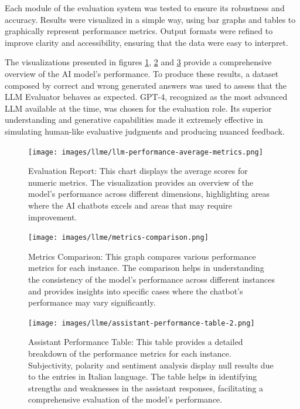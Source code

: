 Each module of the evaluation system was tested to ensure its robustness and accuracy. Results were visualized in a simple way, using bar graphs and tables to graphically represent performance metrics. Output formats were refined to improve clarity and accessibility, ensuring that the data were easy to interpret.

The visualizations presented in figures \ref{fig:llm-performance-average-metrics}, \ref{fig:metrics-comparison} and \ref{fig:assistant-performance-table} provide a comprehensive overview of the AI model's performance. To produce these results, a dataset composed by correct and wrong generated answers was used to assess that the LLM Evaluator behaves as expected. GPT-4, recognized as the most advanced LLM available at the time, was chosen for the evaluation role. Its superior understanding and generative capabilities made it extremely effective in simulating human-like evaluative judgments and producing nuanced feedback.

\begin{figure}[h!]
    \centering
    \texttt{[image: images/llme/llm-performance-average-metrics.png]}
    \caption{Evaluation Report: This chart displays the average scores for numeric metrics. The visualization provides an overview of the model's performance across different dimensions, highlighting areas where the AI chatbots excels and areas that may require improvement.}
    \label{fig:llm-performance-average-metrics}
\end{figure}

\begin{figure}[h!]
    \centering
    \texttt{[image: images/llme/metrics-comparison.png]}
    \caption{Metrics Comparison: This graph compares various performance metrics for each instance. The comparison helps in understanding the consistency of the model's performance across different instances and provides insights into specific cases where the chatbot's performance may vary significantly.}
    \label{fig:metrics-comparison}
\end{figure}

\begin{figure}[h!]
    \centering
    \texttt{[image: images/llme/assistant-performance-table-2.png]}
    \caption{Assistant Performance Table: This table provides a detailed breakdown of the performance metrics for each instance. Subjectivity, polarity and sentiment analysis display null results due to the entries in Italian language. The table helps in identifying strengths and weaknesses in the assistant responses, facilitating a comprehensive evaluation of the model's performance.}
    \label{fig:assistant-performance-table}
\end{figure}


